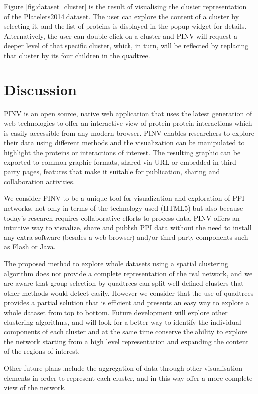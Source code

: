 \begin{description}
Figure \ref{fig:dataset_cluster} is the result of visualising the cluster representation of the Platelets2014 dataset. The user can explore the content of a cluster by selecting it, and the list of proteins is displayed in the popup widget for details. Alternatively, the user can double click on a cluster and PINV will request a deeper level of that specific cluster, which, in turn, will be reflected by replacing that cluster by its four children in the quadtree.


\end{description}
\section{Discussion}
PINV is an open source, native web application that uses the latest generation of web technologies to offer an interactive view of protein-protein interactions which is easily accessible from any modern browser. PINV enables researchers to explore their data using different methods and the visualization can be manipulated to highlight the proteins or interactions of interest. The resulting graphic can be exported to common graphic formats, shared via URL or embedded in third-party pages, features that make it suitable for publication, sharing and collaboration activities.

We consider PINV to be a unique tool for visualization and exploration of PPI networks, not only in terms of the technology used (HTML5) but also because today's research requires collaborative efforts to process data. PINV offers an intuitive way to visualize, share and publish PPI data without the need to install any extra software (besides a web browser) and/or third party components such as Flash or Java.

The proposed method to explore whole datasets using a spatial clustering algorithm does not provide a complete representation of the real network, and we are aware that group selection by quadtrees can split well defined clusters that other methods would detect easily. However we consider that the use of quadtrees provides a partial solution that is efficient and presents an easy way to explore a whole dataset from top to bottom. Future development will explore other clustering algorithms,  and will look for a better way to  identify the individual components of each cluster and at the same time conserve the ability to explore the network starting from a high level representation and expanding the content of the regions of interest.

Other future plans include the aggregation of data through other visualisation elements in order to represent each cluster, and in this way offer a more complete view of the network.

 
